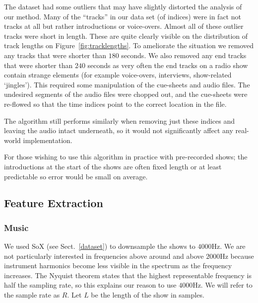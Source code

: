 \documentclass[twocolumn]{article}
\begin{document}
	The dataset had some outliers that may have slightly distorted the analysis of our method. Many of the ``tracks'' in our data set (of indices) were in fact not tracks at all but rather introductions or voice-overs. Almost all of these outlier tracks were short in length. These are quite clearly visible on the distribution of track lengths on Figure~\ref{fig:tracklengths}. To ameliorate the situation we removed any tracks that were shorter than $180$ seconds. We also removed any end tracks that were shorter than $240$ seconds as very often the end tracks on a radio show contain strange elements (for example voice-overs, interviews, show-related `jingles'). This required some manipulation of the cue-sheets and audio files. The undesired segments of the audio files were chopped out, and the cue-sheets were re-flowed so that the time indices point to the correct location in the file. 
	
	The algorithm still performs similarly when removing just these indices and leaving the audio intact underneath, so it would not significantly affect any real-world implementation. 
	
	For those wishing to use this algorithm in practice with pre-recorded shows; the introductions at the start of the shows are often fixed length or at least predictable so error would be small on average.
	
	\subsection{Feature Extraction}
	
	\subsubsection{Music}\label{feat_ex} %
	
	We used SoX (see Sect.~\ref{dataset}) to downsample the shows to $4000$Hz. We are not particularly interested in frequencies above around and above $2000$Hz because instrument harmonics become less visible in the spectrum as the frequency increases. The Nyquist theorem \cite{nyquist1928certain} states that the highest representable frequency is half the sampling rate, so this explains our reason to use $4000$Hz. We will refer to the sample rate as $R$. Let $L$ be the length of the show in samples.
	
\end{document}
